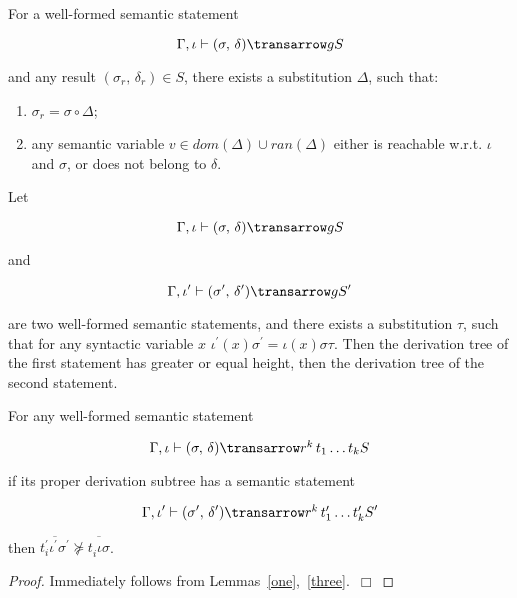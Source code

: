 \begin{lemma}
\label{two}
\normalfont
For a well-formed semantic statement 

$$
\otrans{\Gamma,\iota}{(\sigma,\,\delta)}{g}{S}
$$ 

\noindent and any result \mbox{$(\sigma_r,\,\delta_r) \in S$}, there exists a substitution $\Delta$, such that:
  \begin{enumerate}
    \item \mbox{$\sigma_r = \sigma\circ\Delta$};
    \item any semantic variable \mbox{$v\in dom(\Delta)\cup ran(\Delta)$} either is reachable w.r.t. $\iota$ and $\sigma$,
 or does not belong to $\delta$.
  \end{enumerate}   
\end{lemma}

\begin{lemma}
\label{three}
\normalfont
Let 

$$
\otrans{\Gamma,\iota}{(\sigma,\,\delta)}{g}{S}
$$ 

and 

$$\otrans{\Gamma,\iota^\prime}{(\sigma^\prime,\,\delta^\prime)}{g}{S^\prime}
$$

\noindent are two well-formed semantic statements, and there exists a substitution $\tau$, such that 
for any syntactic variable $x$ \mbox{$\iota^\prime(x) \sigma^\prime = \iota(x) \sigma \tau$}. Then the 
derivation tree of the first statement has greater or equal height, then the derivation 
tree of the second statement.
\end{lemma}

\begin{theorem}
\normalfont
For any well-formed semantic statement 

$$
\otrans{\Gamma,\iota}{(\sigma,\,\delta)}{r^k\,t_1\dots t_k}{S}
$$ 

if its proper derivation subtree has a semantic statement 

$$
\otrans{\Gamma,\iota^\prime}{(\sigma^\prime,\,\delta^\prime)}{r^k\,t^\prime_1\dots t^\prime_k}{S^\prime}
$$

then $\overline{t^\prime_i \iota^\prime \sigma^\prime} \not \succeq \overline{t^{\phantom{\prime}}_i \iota \sigma}$. 
\end{theorem}
\begin{proof}
Immediately follows from Lemmas~\ref{one},~\ref{three}.~$\Box$
\end{proof}
